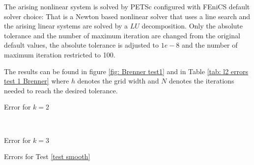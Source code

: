 The arising nonlinear system is solved by PETSc configured with FEniCS default solver choice: That is a Newton based nonlinear solver that uses a line search and the arising linear systems are solved by a $LU$ decomposition.
Only the absolute tolerance and the number of maximum iteration are changed from the original default values, the absolute tolerance is adjusted to $1e-8$ and the number of maximum iteration restricted to 100. 

The results can be found in figure \ref{fig: Brenner test1} and in Table \ref{tab: l2 errors test 1 Brenner} where $h$ denotes the grid width and $N$ denotes the iterations needed to reach the desired tolerance. 

\begin{table}[H]
	\begin{subtable}[b]{0.45\textwidth}
		\centering
		\pgfplotstabletypeset[columns={iterations, l2error, h1error,N},
				    every row 0 column 0/.style={set content=init},
		]\MAOneBrennerTwo
    	\caption{Error for $k=2$}
   \end{subtable}
   ~
	\begin{subtable}[b]{0.45\textwidth}
		\centering
		\pgfplotstabletypeset[columns={iterations, l2error, h1error,N},
				    every row 0 column 0/.style={set content=init},
		]\MAOneBrennerThree
 	\caption{Error for $k=3$}
	\end{subtable}
	\caption{Errors for Test \ref{test smooth}}
	\label{tab: l2 errors test 1 Brenner}
\end{table}

